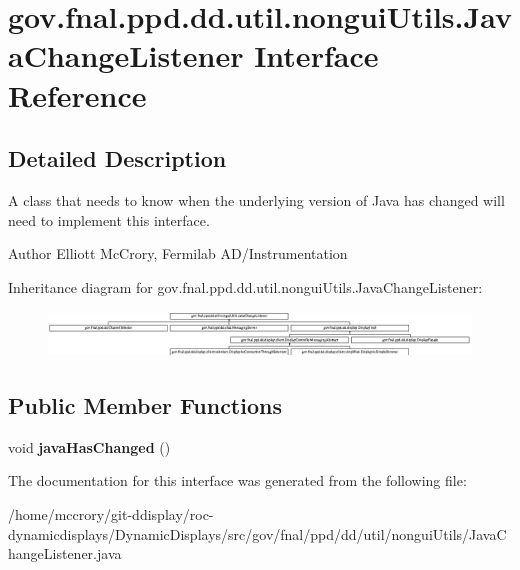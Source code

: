 \hypertarget{interfacegov_1_1fnal_1_1ppd_1_1dd_1_1util_1_1nonguiUtils_1_1JavaChangeListener}{\section{gov.\-fnal.\-ppd.\-dd.\-util.\-nongui\-Utils.\-Java\-Change\-Listener Interface Reference}
\label{interfacegov_1_1fnal_1_1ppd_1_1dd_1_1util_1_1nonguiUtils_1_1JavaChangeListener}
}


\subsection{Detailed Description}
A class that needs to know when the underlying version of Java has changed will need to implement this interface.

\begin{DoxyAuthor}{Author}
Elliott Mc\-Crory, Fermilab A\-D/\-Instrumentation 
\end{DoxyAuthor}
Inheritance diagram for gov.\-fnal.\-ppd.\-dd.\-util.\-nongui\-Utils.\-Java\-Change\-Listener\-:\begin{figure}[H]
\begin{center}
\leavevmode
\includegraphics[height=1.209503cm]{interfacegov_1_1fnal_1_1ppd_1_1dd_1_1util_1_1nonguiUtils_1_1JavaChangeListener}
\end{center}
\end{figure}
\subsection*{Public Member Functions}
\begin{DoxyCompactItemize}
\item 
\hypertarget{interfacegov_1_1fnal_1_1ppd_1_1dd_1_1util_1_1nonguiUtils_1_1JavaChangeListener_af445b8c9b305e7493a08dc75266e2c7b}{void {\bfseries java\-Has\-Changed} ()}\label{interfacegov_1_1fnal_1_1ppd_1_1dd_1_1util_1_1nonguiUtils_1_1JavaChangeListener_af445b8c9b305e7493a08dc75266e2c7b}

\end{DoxyCompactItemize}


The documentation for this interface was generated from the following file\-:\begin{DoxyCompactItemize}
\item 
/home/mccrory/git-\/ddisplay/roc-\/dynamicdisplays/\-Dynamic\-Displays/src/gov/fnal/ppd/dd/util/nongui\-Utils/Java\-Change\-Listener.\-java\end{DoxyCompactItemize}
